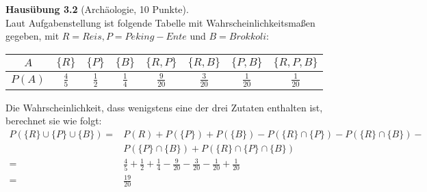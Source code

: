 \textbf{Hausübung 3.2} (Archäologie, 10 Punkte).\\
Laut Aufgabenstellung ist folgende Tabelle mit Wahrscheinlichkeitsmaßen gegeben, mit $R=Reis, P=Peking-Ente$ und $B=Brokkoli$:\\

\begin{tabular}{|c|c|c|c|c|c|c|c|}
		\hline $A$ & $\{R\}$ & $\{P\}$ & $\{B\}$ & $\{R, P\}$ & $\{R, B\}$ & $\{P, B\}$ & $\{R, P, B\}$ \\
		\hline $P(A)$ & $\frac{4}{5}$ & $\frac{1}{2}$ & $\frac{1}{4}$ & $\frac{9}{20}$ & $\frac{3}{20}$ & $\frac{1}{20}$ & $\frac{1}{20}$\\
		\hline
\end{tabular}

Die Wahrscheinlichkeit, dass wenigstens eine der drei Zutaten enthalten ist, berechnet sie wie folgt:\\
\begin{equation*}
	\begin{split}
	P(\{R\}\cup \{P\}  \cup \{B\}) = &P({R}) + P(\{P\}) + P(\{B\}) - P(\{R\}\cap \{P\}) - P(\{R\}\cap \{B\}) - \\
	&P(\{P\}\cap \{B\}) + P(\{R\}\cap \{P\} \cap \{B\})\\
	= &\frac{4}{5} + \frac{1}{2} +\frac{1}{4} - \frac{9}{20} - \frac{3}{20} - \frac{1}{20} + \frac{1}{20}\\
	= &\frac{19}{20}
	\end{split}
\end{equation*}

